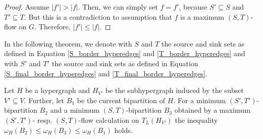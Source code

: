 \begin{proof}
Assume $|f'| > |f|$. Then, we can simply set $f = f'$, because $S' \subseteq S$ and
$T' \subseteq T$. But this is a contradiction to assumption that $f$ is a maximum $(S,T)$-flow
on $G$. Therefore, $|f'| \le |f|$.
\end{proof}

In the following theorem, we denote with $S$ and $T$ the source and sink sets as defined in 
Equation \ref{S_border_hyperedges} and \ref{T_border_hyperedges} and with $S'$ and $T'$ the
source and sink sets as defined in Equation \ref{S_final_border_hyperedges} and
\ref{T_final_border_hyperedges}.

\begin{theorem}
Let $H$ be a hypergraph and $H_{V'}$ be the subhypergraph induced by the subset $V' \subseteq V$.
Further, let $B_1$ be the current bipartition of $H$. For a minimum $(S',T')$-bipartition $B_2$ and
a minimum $(S,T)$-bipartition $B_3$ obtained by a maximum $(S',T')$- resp. $(S,T)$-flow calculation
on $T_L(H_{V'})$ the inequality $\omega_H(B_2) \le \omega_H(B_3) \le \omega_H(B_1)$ holds.
\end{theorem}

